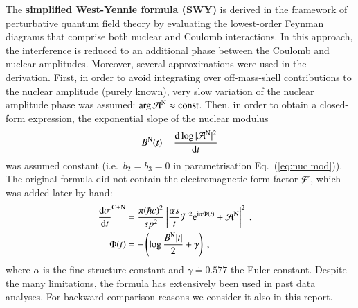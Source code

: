 The {\bf simplified West-Yennie formula (SWY)} \cite{wy68} is derived in the framework of perturbative quantum field theory by evaluating the lowest-order Feynman diagrams that comprise both nuclear and Coulomb interactions. In this approach, the interference is reduced to an additional phase between the Coulomb and nuclear amplitudes. Moreover, several approximations were used in the derivation. First, in order to avoid integrating over off-mass-shell contributions to the nuclear amplitude (purely known), very slow variation of the nuclear amplitude phase was assumed: $\arg {\cal A}^{\rm N} \approx \hbox{const}$. Then, in order to obtain a closed-form expression, the exponential slope of the nuclear modulus
\begin{equation}
\label{eq:nuc slope}
B^{\rm N}(t) = {\d \log |{\cal A}^{\rm N}|^2 \over \d t}
\end{equation}
was assumed constant (i.e.~$b_2 = b_3 = 0$ in parametrisation Eq.~(\ref{eq:nuc mod})). The original formula did not contain the electromagnetic form factor ${\cal F}$, which was added later by hand:
\begin{equation}
\label{eq:int swy}
	\begin{aligned}
		{\d\sigma\over \d t}^{\rm C+N} &= {\pi (\hbar c)^2 \over s p^2} \left | {\alpha s\over t} {\cal F}^2 \e^{\I\alpha \Phi(t)} + {\cal A}^{\rm N} \right |^2\ ,\cr
		\Phi(t) &= - \left( \log {B^{\rm N} |t|\over 2} + \gamma \right)\ ,\cr
	\end{aligned}
\end{equation}
where $\alpha$ is the fine-structure constant and $\gamma \doteq 0.577$ the Euler constant. Despite the many limitations, the formula has extensively been used in past data analyses. For backward-comparison reasons we consider it also in this report.


